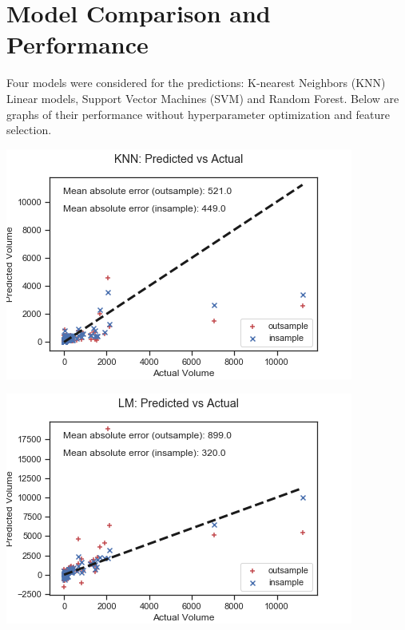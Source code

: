 \documentclass[12pt,a4paper,leqno]{report}
\theoremstyle{plain}
\theoremstyle{definition}
\theoremstyle{remark}
\begin{document}
\section{Model Comparison and Performance}

Four models were considered for the predictions: K-nearest Neighbors (KNN)
Linear models, Support Vector Machines (SVM) and Random Forest. Below are graphs
of their performance without hyperparameter optimization and feature selection.

\bigskip
{
    \centering
    \includegraphics[width=\textwidth,height=\textheight,keepaspectratio]{predictions_unoptimized_simple_knn.png}
    \par
}
\bigskip

\bigskip
{
    \centering
    \includegraphics[width=\textwidth,height=\textheight,keepaspectratio]{predictions_unoptimized_simple_lm.png}
    \par
}
\bigskip
\end{document}
